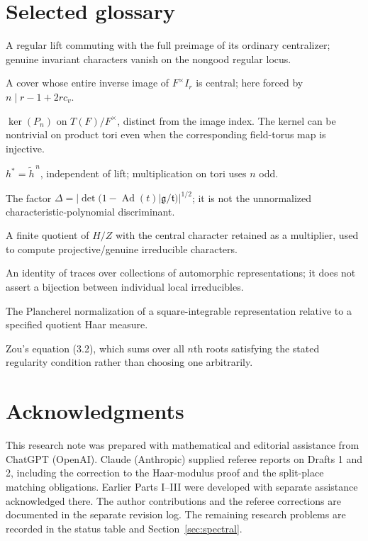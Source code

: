 \documentclass[11pt]{article}
\theoremstyle{plain}
\theoremstyle{definition}
\begin{document}
\section{Selected glossary}\label{sec:glossary}
\begin{description}[style=nextline,leftmargin=3.0cm]
\item[Good element] A regular lift commuting with the full preimage of its ordinary centralizer; genuine invariant characters vanish on the nongood regular locus.
\item[Scalar-central cover] A cover whose entire inverse image of $F^\times I_r$ is central; here forced by $n\mid r-1+2rc_v$.
\item[Power-map kernel] $\ker(P_n)$ on $T(F)/F^\times$, distinct from the image index.  The kernel can be nontrivial on product tori even when the corresponding field-torus map is injective.
\item[Star map] $h^*=\widetilde h^{\,n}$, independent of lift; multiplication on tori uses $n$ odd.
\item[Weyl discriminant] The factor $\Delta=|\det(1-\operatorname{Ad}(t)|\mathfrak g/\mathfrak t)|^{1/2}$; it is not the unnormalized characteristic-polynomial discriminant.
\item[Twisted finite quotient] A finite quotient of $H/Z$ with the central character retained as a multiplier, used to compute projective/genuine irreducible characters.
\item[Packet identity] An identity of traces over collections of automorphic representations; it does not assert a bijection between individual local irreducibles.
\item[Formal degree] The Plancherel normalization of a square-integrable representation relative to a specified quotient Haar measure.
\item[Root-sum relation] Zou's equation (3.2), which sums over all $n$th roots satisfying the stated regularity condition rather than choosing one arbitrarily.
\end{description}

\section*{Acknowledgments}
This research note was prepared with mathematical and editorial
assistance from ChatGPT (OpenAI).  Claude (Anthropic) supplied referee reports on Drafts 1 and 2,
including the correction to the Haar-modulus proof and the
split-place matching obligations.  Earlier Parts I--III were developed
with separate assistance acknowledged there.  The author contributions and the referee corrections are documented
in the separate revision log.  The remaining research problems are
recorded in the status table and Section~\ref{sec:spectral}.
\end{document}
